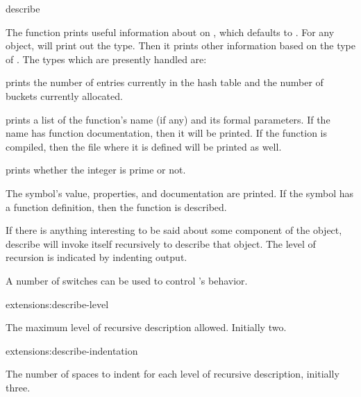 \begin{defun}{}{describe}{ }
  
  The  function prints useful information about
   on , which defaults to
  .  For any object,  will
  print out the type.  Then it prints other information based on the
  type of .  The types which are presently handled are:

  \begin{Lentry}
  
  \item[\tindexed{hash-table}]  prints the number of
    entries currently in the hash table and the number of buckets
    currently allocated.
  
  \item[\tindexed{function}]  prints a list of the
    function's name (if any) and its formal parameters.  If the name
    has function documentation, then it will be printed.  If the
    function is compiled, then the file where it is defined will be
    printed as well.
  
  \item[\tindexed{fixnum}]  prints whether the integer
    is prime or not.
  
  \item[\tindexed{symbol}] The symbol's value, properties, and
    documentation are printed.  If the symbol has a function
    definition, then the function is described.
  \end{Lentry}
  If there is anything interesting to be said about some component of
  the object, describe will invoke itself recursively to describe that
  object.  The level of recursion is indicated by indenting output.
\end{defun}

A number of switches can be used to control 's behavior.

\begin{defvar}{extensions:}{describe-level}

  The maximum level of recursive description allowed.  Initially two.
\end{defvar}

\begin{defvar}{extensions:}{describe-indentation}

The number of spaces to indent for each level of recursive
description, initially three.
\end{defvar}

